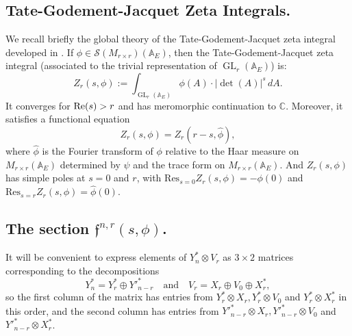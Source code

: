 \documentclass[10pt]{amsart}
\theoremstyle{plain}
\numberwithin{equation}{section}
\begin{document}
 \subsection{\bf Tate-Godement-Jacquet Zeta Integrals.}\label{zetaintegral}
We recall briefly the global  theory of the Tate-Godement-Jacquet zeta
integral developed in \cite{GJ}. If $\phi \in \mathcal{S}(M_{r \times
  r})({\mathbb{A}}_E)$, then the Tate-Godement-Jacquet zeta integral (associated
to the trivial representation of ${\operatorname{GL}}_r({\mathbb{A}}_E)$) is:
 \[ Z_r (s , \phi) :=  \int_{{\operatorname{GL}}_r({\mathbb{A}}_E)} \phi(A)  \cdot |\det (A)|^s  \, dA. \]
 It converges for ${\rm Re}(s) > r$ and has meromorphic continuation to
 ${\mathbb C}$. Moreover, it satisfies a functional equation
 \begin{equation} \label{E:funct}
   Z_r(s,\phi)  = Z_r(r-s, \hat{\phi}),
\end{equation}
 where $\hat{\phi}$ is the Fourier transform of $\phi$ relative to the
 Haar measure on $M_{r\times r}({\mathbb{A}}_E)$ determined by $\psi$ and the
 trace form on $M_{r \times r}({\mathbb{A}}_E)$.  And $Z_r(s,\phi)$ has simple
 poles at $s=0$ and $r$, with $\mathrm{Res}_{s=0}Z_r(s,\phi)=-\phi(0)$
 and $\mathrm{Res}_{s=r}Z_r(s,\phi)=\hat{\phi}(0)$.
\vskip 5pt

\subsection{\bf The section  $\mathfrak{f}^{n,r}(s,\phi)$.}
 It will be convenient to express elements of $Y_n^* \otimes V_r$ as
 $3 \times 2$ matrices corresponding to the decompositions
 \[  
Y^*_n  = Y^*_r \oplus {Y'}^*_{n-r} \quad \text{and} \quad V_r  = X_r \oplus
V_0 \oplus X_r^*,
\]
so the first column of the matrix has entries from $Y^*_r\otimes X_r,
Y^*_r\otimes V_0$ and $Y^*_r\otimes X_r^*$ in this order, and the second
column has entries from ${Y'}^*_{n-r}\otimes X_r, {Y'}^*_{n-r}\otimes
V_0$ and ${Y'}^*_{n-r}\otimes X_r^*$.
\end{document}
